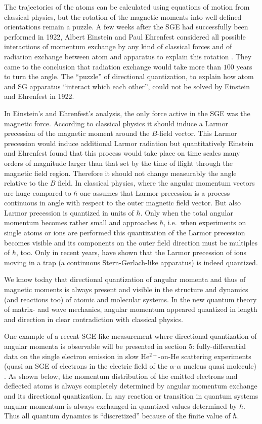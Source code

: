 \documentclass{article}
\begin{document}
The trajectories of the atoms can be calculated using equations of motion from classical physics, but the rotation of the magnetic moments into well-defined orientations remain a puzzle. A few weeks after the SGE had successfully been performed in 1922, Albert Einstein and Paul Ehrenfest considered all possible interactions of momentum exchange by any kind of classical forces and of radiation exchange between atom and apparatus to explain this rotation \citep{EinsteinAEtAl1922Bemerkungen,UnnaIEtal2013Einstein}. They came to the conclusion that radiation exchange would take more than $100$ years to turn the angle. The ``puzzle'' of directional quantization, to explain how atom and SG apparatus ``interact which each other'', could not be solved by Einstein and Ehrenfest in 1922. 
 
In Einstein's and Ehrenfest's analysis, the only force active in the SGE was the magnetic force. According to classical physics it should induce a Larmor precession of the magnetic moment around the $B$-field vector. This Larmor precession would induce additional Larmor radiation but quantitatively Einstein and Ehrenfest found that this process would take place on time scales many orders of magnitude larger than that set by the time of flight through the magnetic field region. Therefore it should not change measurably the angle relative to the $B$ field. In classical physics, where the angular momentum vectors are huge compared to $\hbar$ one assumes that Larmor precession is a process continuous in angle with respect to the outer magnetic field vector. But also Larmor precession is quantized in units of $\hbar$. Only when the total angular momentum becomes rather small and approaches $\hbar$, i.e.\ when experiments on single atoms or ions are performed this quantization of the Larmor precession becomes visible and its components on the outer field direction must be multiples of $\hbar$, too. Only in recent years, \cite{HermansphanNEtal2000Observation} have shown that the Larmor precession of ions moving in a trap (a continuous Stern-Gerlach-like apparatus) is indeed quantized.
 
We know today that directional quantization of angular momenta and thus of magnetic moments is always present and visible in the structure and dynamics (and reactions too) of atomic and molecular systems. In the new quantum theory of matrix- and wave mechanics, angular momentum appeared quantized in length and direction in clear contradiction with classical physics.
 
One example of a recent SGE-like measurement where directional quantization of angular momenta is observable will be presented in section 5: fully-differential data on the single electron emission in slow He$^{2+}$-on-He scattering experiments (quasi an SGE of electrons in the electric field of the $\alpha$-$\alpha$ nucleus quasi molecule) \citep{SchmidtLEtal2014Vortices}. As shown below, the momentum distribution of the emitted electrons and deflected atoms is always completely determined by angular momentum exchange and its directional quantization. In any reaction or transition in quantum systems angular momentum is always exchanged in quantized values determined by $\hbar$. Thus all quantum dynamics is ``discretized'' because of the finite value of $\hbar$.   
 
\end{document}

